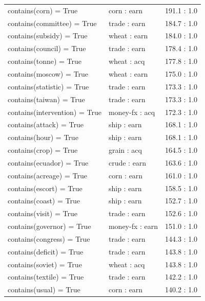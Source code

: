 \documentclass{article}
\begin{document}
\begin{table}
\begin{tabular}{l|l|l}
          contains(corn) = True &             corn : earn   &    191.1 : 1.0\\
     contains(committee) = True   &          trade : earn   &    184.7 : 1.0\\
       contains(subsidy) = True     &        wheat : earn   & 184.0 : 1.0 \\
       contains(council) = True       &      trade : earn   & 178.4 : 1.0 \\
       contains(tonne) = True          &  wheat : acq    &    177.8 : 1.0\\
        contains(moscow) = True       &     wheat : earn   & 175.0 : 1.0\\
     contains(statistic) = True      &      trade : earn   & 173.3 : 1.0\\
        contains(taiwan) = True     &       trade : earn   &    173.3 : 1.0\\
  contains(intervention) = True    &       money-fx : acq    &    172.3 : 1.0\\
        contains(attack) = True   &          ship : earn   &    168.1 : 1.0\\
          contains(hour) = True  &           ship : earn & 168.1 : 1.0\\
          contains(crop) = True &           grain : acq  &    164.5 : 1.0\\
       contains(ecuador) = True &            crude : earn &    163.6 : 1.0\\
       contains(acreage) = True            & corn : earn &    161.0 : 1.0\\
        contains(escort) = True           &  ship : earn & 158.5 : 1.0\\
         contains(coast) = True          &   ship : earn &    152.7 : 1.0\\
         contains(visit) = True         &   trade : earn &    152.6 : 1.0\\
      contains(governor) = True        &   money-fx : earn & 151.0 : 1.0\\
      contains(congress) = True       &     trade : earn &    144.3 : 1.0\\
       contains(deficit) = True      &      trade : earn &    143.8 : 1.0\\
        contains(soviet) = True     &       wheat : acq  &    143.8 : 1.0\\
       contains(textile) = True    &        trade : earn &    142.2 : 1.0\\
         contains(usual) = True   &          corn : earn  & 140.2 : 1.0\\

\end{tabular}
\end{table}
\end{document}
